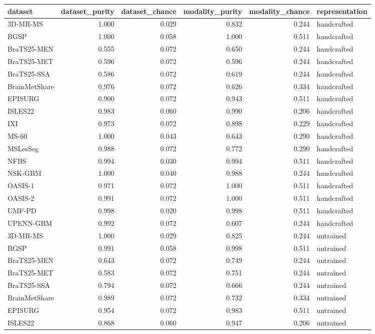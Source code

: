 \begin{tabular}{lrrrrl}
\toprule
dataset & dataset\_purity & dataset\_chance & modality\_purity & modality\_chance & representation \\
\midrule
3D-MR-MS & 1.000 & 0.029 & 0.832 & 0.244 & handcrafted \\
BGSP & 1.000 & 0.058 & 1.000 & 0.511 & handcrafted \\
BraTS25-MEN & 0.555 & 0.072 & 0.650 & 0.244 & handcrafted \\
BraTS25-MET & 0.596 & 0.072 & 0.596 & 0.244 & handcrafted \\
BraTS25-SSA & 0.586 & 0.072 & 0.619 & 0.244 & handcrafted \\
BrainMetShare & 0.976 & 0.072 & 0.626 & 0.334 & handcrafted \\
EPISURG & 0.900 & 0.072 & 0.943 & 0.511 & handcrafted \\
ISLES22 & 0.983 & 0.060 & 0.990 & 0.206 & handcrafted \\
IXI & 0.973 & 0.072 & 0.898 & 0.229 & handcrafted \\
MS-60 & 1.000 & 0.043 & 0.643 & 0.290 & handcrafted \\
MSLesSeg & 0.988 & 0.072 & 0.772 & 0.290 & handcrafted \\
NFBS & 0.994 & 0.030 & 0.994 & 0.511 & handcrafted \\
NSK-GBM & 1.000 & 0.040 & 0.988 & 0.244 & handcrafted \\
OASIS-1 & 0.971 & 0.072 & 1.000 & 0.511 & handcrafted \\
OASIS-2 & 0.991 & 0.072 & 1.000 & 0.511 & handcrafted \\
UMF-PD & 0.998 & 0.020 & 0.998 & 0.511 & handcrafted \\
UPENN-GBM & 0.992 & 0.072 & 0.607 & 0.244 & handcrafted \\
3D-MR-MS & 1.000 & 0.029 & 0.825 & 0.244 & untrained \\
BGSP & 0.991 & 0.058 & 0.998 & 0.511 & untrained \\
BraTS25-MEN & 0.643 & 0.072 & 0.749 & 0.244 & untrained \\
BraTS25-MET & 0.583 & 0.072 & 0.751 & 0.244 & untrained \\
BraTS25-SSA & 0.794 & 0.072 & 0.666 & 0.244 & untrained \\
BrainMetShare & 0.989 & 0.072 & 0.732 & 0.334 & untrained \\
EPISURG & 0.954 & 0.072 & 0.983 & 0.511 & untrained \\
ISLES22 & 0.868 & 0.060 & 0.947 & 0.206 & untrained \\

\end{tabular}

